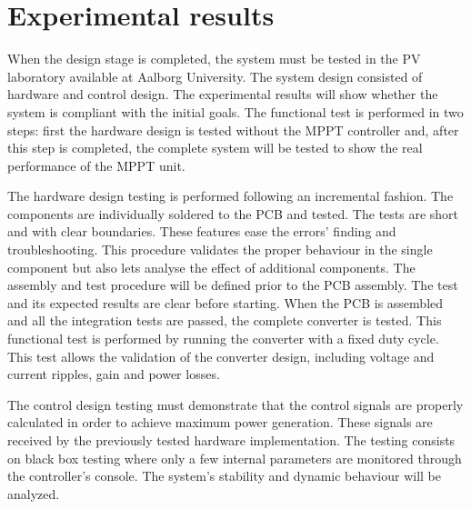 
\chapter{Experimental results} \label{ch:test_validation}

When the design stage is completed, the system must be tested in the PV laboratory available at Aalborg University. The system design consisted of hardware and control design. The experimental results will show whether the system is compliant with the initial goals. The functional test is performed in two steps: first the hardware design is tested without the MPPT controller and, after this step is completed, the complete system will be tested to show the real performance of the MPPT unit.

The hardware design testing is performed following an incremental fashion. The components are individually soldered to the PCB and tested. The tests are short and with clear boundaries. These features ease the errors' finding and troubleshooting. This procedure validates the proper behaviour in the single component but also lets analyse the effect of additional components. The assembly and test procedure will be defined prior to the PCB assembly. The test and its expected results are clear before starting. When the PCB is assembled and all the integration tests are passed, the complete converter is tested. This functional test is performed by running the converter with a fixed duty cycle. This test allows the validation of the converter design, including voltage and current ripples, gain and power losses.

The control design testing must demonstrate that the control signals are properly calculated in order to achieve maximum power generation. These signals are received by the previously tested hardware implementation. The testing consists on black box testing where only a few internal parameters are monitored through the controller's console. The 
system's stability and dynamic behaviour will be analyzed.



